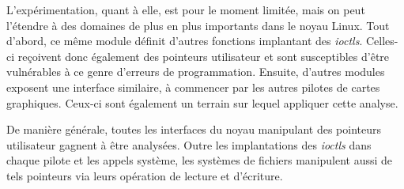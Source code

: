 L'expérimentation, quant à elle, est pour le moment limitée, mais on peut
l'étendre à des domaines de plus en plus importants dans le noyau Linux. Tout
d'abord, ce même module définit d'autres fonctions implantant des \emph{ioctls}.
Celles-ci reçoivent donc également des pointeurs utilisateur et sont
susceptibles d'être vulnérables à ce genre d'erreurs de programmation. Ensuite,
d'autres modules exposent une interface similaire, à commencer par les autres
pilotes de cartes graphiques. Ceux-ci sont également un terrain sur lequel
appliquer cette analyse.

De manière générale, toutes les interfaces du noyau manipulant des pointeurs
utilisateur gagnent à être analysées. Outre les implantations des \emph{ioctls}
dans chaque pilote et les appels système, les systèmes de fichiers manipulent
aussi de tels pointeurs via leurs opération de lecture et d'écriture.

